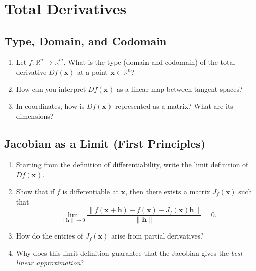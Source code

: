 \section{Total Derivatives}

\subsection{Type, Domain, and Codomain}
\begin{enumerate}
  \item Let $f : \mathbb{R}^n \to \mathbb{R}^m$. What is the type (domain and codomain) of the total derivative $Df(\mathbf{x})$ at a point $\mathbf{x} \in \mathbb{R}^n$?
  \item How can you interpret $Df(\mathbf{x})$ as a linear map between tangent spaces?
  \item In coordinates, how is $Df(\mathbf{x})$ represented as a matrix? What are its dimensions?
\end{enumerate}

\subsection{Jacobian as a Limit (First Principles)}
\begin{enumerate}[resume]
  \item Starting from the definition of differentiability, write the limit definition of $Df(\mathbf{x})$.
  \item Show that if $f$ is differentiable at $\mathbf{x}$, then there exists a matrix $J_f(\mathbf{x})$ such that
    \[
      \lim_{\|\mathbf{h}\| \to 0} \frac{\|f(\mathbf{x}+\mathbf{h}) - f(\mathbf{x}) - J_f(\mathbf{x})\mathbf{h}\|}{\|\mathbf{h}\|} = 0.
    \]
  \item How do the entries of $J_f(\mathbf{x})$ arise from partial derivatives?
  \item Why does this limit definition guarantee that the Jacobian gives the \emph{best linear approximation}?
\end{enumerate}


